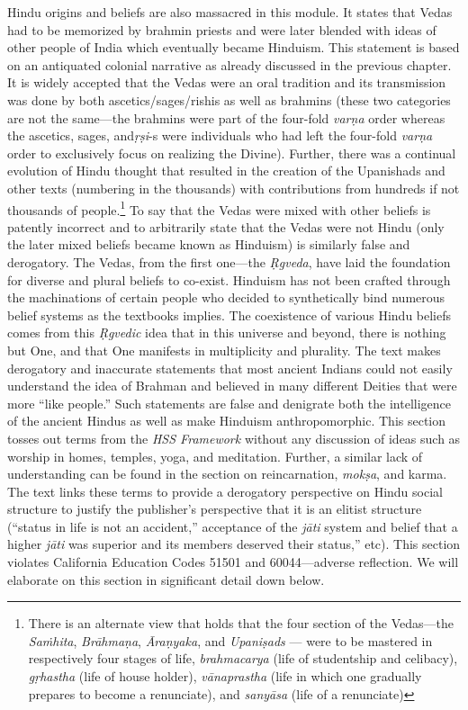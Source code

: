 Hindu origins and beliefs are also massacred in this module. It states that Vedas had to be memorized by brahmin priests and were later blended with ideas of other people of India which eventually became Hinduism. This statement is based on an antiquated colonial narrative as already discussed in the previous chapter. It is widely accepted that the Vedas were an oral tradition and its transmission was done by both ascetics/sages/rishis as well as brahmins (these two categories are not the same—the brahmins were part of the four-fold \textit{varṇa}  order whereas the ascetics, sages, and\break \textit{ṛṣi}-s were individuals who had left the four-fold \textit{varṇa}  order to exclusively focus on realizing the Divine). Further, there was a continual evolution of Hindu thought that resulted in the creation of the Upanishads and other texts (numbering in the thousands) with contributions from hundreds if not thousands of people.\footnote{There is an alternate view that holds that the four section of the Vedas—the \textit{Saṁhita}, \textit{Brāhmaṇa}, \textit{Āraṇyaka}, and \textit{Upaniṣads} — were to be mastered in respectively four stages of life, \textit{brahmacarya} (life of studentship and celibacy), \textit{gṛhastha} (life of house holder), \textit{vānaprastha} (life in which one gradually prepares to become a renunciate), and \textit{sanyāsa} (life of a renunciate)} To say that the Vedas were mixed with other beliefs is patently incorrect and to arbitrarily state that the Vedas were not Hindu (only the later mixed beliefs became known as Hinduism) is similarly false and derogatory. The Vedas, from the first one—the \textit{Ṛgveda}, have laid the foundation for diverse and plural beliefs to co-exist. Hinduism has not been crafted through the machinations of certain people who decided to synthetically bind numerous belief systems as the textbooks implies. The coexistence of various Hindu beliefs comes from this \textit{Ṛgvedic} idea that in this universe and beyond, there is nothing but One, and that One manifests in multiplicity and plurality. The text makes derogatory and inaccurate statements that most ancient Indians could not easily understand the idea of Brahman and believed in many different Deities that were more “like people.” Such statements are false and denigrate both the intelligence of the ancient Hindus as well as make Hinduism anthropomorphic. This section tosses out terms from the \textit{HSS Framework} without any discussion of ideas such as worship in homes, temples, yoga, and meditation. Further, a similar lack of understanding can be found in the section on reincarnation, \textit{mokṣa}, and karma. The text links these terms to provide a derogatory perspective on Hindu social structure to justify the publisher’s perspective that it is an elitist structure (“status in life is not an accident,” acceptance of the \textit{jāti} system and belief that a higher \textit{jāti} was superior and its members deserved their status,” etc). This section violates California Education Codes 51501 and 60044—adverse reflection. We will elaborate on this section in significant detail down below.  

